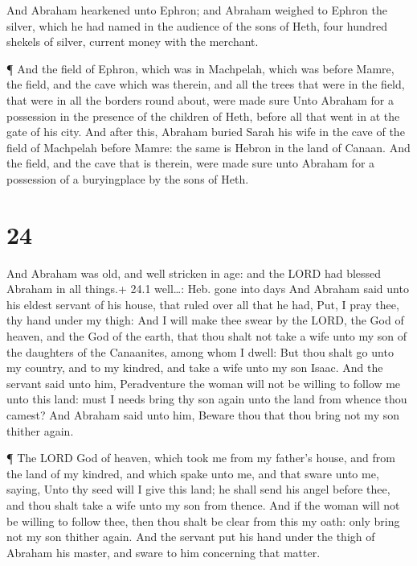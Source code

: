  And Abraham hearkened unto Ephron; and Abraham weighed to
Ephron the silver, which he had named in the audience of the sons of
Heth, four hundred shekels of silver, current money with the merchant.

 ¶ And the field of Ephron, which was in Machpelah, which
was before Mamre, the field, and the cave which was therein, and all the
trees that were in the field, that were in all the borders round about,
were made sure  Unto Abraham for a possession in the
presence of the children of Heth, before all that went in at the gate of
his city.  And after this, Abraham buried Sarah his wife in
the cave of the field of Machpelah before Mamre: the same is Hebron in
the land of Canaan.  And the field, and the cave that is
therein, were made sure unto Abraham for a possession of a buryingplace
by the sons of Heth.

\hypertarget{section-23}{%
\section{24}\label{section-23}}

 And Abraham was old, and well stricken in age: and the LORD
had blessed Abraham in all things.+ 24.1 well\ldots: Heb. gone into days
 And Abraham said unto his eldest servant of his house, that
ruled over all that he had, Put, I pray thee, thy hand under my thigh:
 And I will make thee swear by the LORD, the God of heaven,
and the God of the earth, that thou shalt not take a wife unto my son of
the daughters of the Canaanites, among whom I dwell:  But
thou shalt go unto my country, and to my kindred, and take a wife unto
my son Isaac.  And the servant said unto him, Peradventure
the woman will not be willing to follow me unto this land: must I needs
bring thy son again unto the land from whence thou camest? 
And Abraham said unto him, Beware thou that thou bring not my son
thither again.

 ¶ The LORD God of heaven, which took me from my father's
house, and from the land of my kindred, and which spake unto me, and
that sware unto me, saying, Unto thy seed will I give this land; he
shall send his angel before thee, and thou shalt take a wife unto my son
from thence.  And if the woman will not be willing to follow
thee, then thou shalt be clear from this my oath: only bring not my son
thither again.  And the servant put his hand under the thigh
of Abraham his master, and sware to him concerning that matter.


